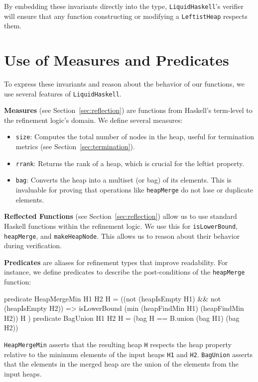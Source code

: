 By embedding these invariants directly into the type, \texttt{LiquidHaskell}'s verifier will ensure that any function constructing or modifying a \texttt{LeftistHeap} respects them.

\section{Use of Measures and Predicates}
To express these invariants and reason about the behavior of our functions, we use several features of \texttt{LiquidHaskell}.

\textbf{Measures} (see Section~\ref{sec:reflection}) are functions from Haskell's term-level to the refinement logic's domain. We define several measures:
\begin{itemize}
	\item \texttt{size}: Computes the total number of nodes in the heap, useful for termination metrics (see Section~\ref{sec:termination}).
	\item \texttt{rrank}: Returns the rank of a heap, which is crucial for the leftist property.
	\item \texttt{bag}: Converts the heap into a multiset (or bag) of its elements. This is invaluable for proving that operations like \texttt{heapMerge} do not lose or duplicate elements.
\end{itemize}

\textbf{Reflected Functions} (see Section~\ref{sec:reflection}) allow us to use standard Haskell functions within the refinement logic. We use this for \texttt{isLowerBound}, \texttt{heapMerge}, and \texttt{makeHeapNode}.
This allows us to reason about their behavior during verification.

\textbf{Predicates} are aliases for refinement types that improve readability. For instance, we define predicates to describe the post-conditions of the \texttt{heapMerge} function:
\begin{code}
 predicate HeapMergeMin H1 H2 H = 
    ((not (heapIsEmpty H1) && not (heapIsEmpty H2)) => 
    isLowerBound (min (heapFindMin H1) (heapFindMin H2)) H )
 predicate BagUnion H1 H2 H = 
    (bag H == B.union (bag H1) (bag H2))
\end{code}
\texttt{HeapMergeMin} asserts that the resulting heap \texttt{H} respects the heap property relative to the minimum elements of the input heaps \texttt{H1} and \texttt{H2}. \texttt{BagUnion} asserts that the elements in the merged heap are the union of the elements from the input heaps.

